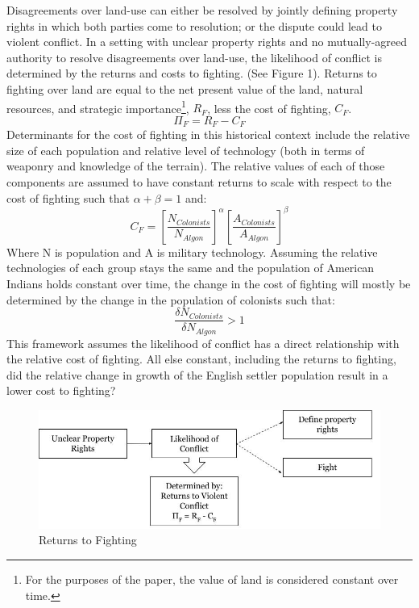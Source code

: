 \documentclass[11pt, oneside]{article}
\begin{document}
Disagreements over land-use can either be resolved by jointly defining property rights in which both parties come to resolution; or the dispute could lead to violent conflict. In a setting with unclear property rights and no mutually-agreed authority to resolve disagreements over land-use, the likelihood of conflict is determined by the returns and costs to fighting. (See Figure 1). Returns to fighting over land are equal to the net present value of the land, natural resources, and strategic importance\footnote{For the purposes of the paper, the value of land is considered constant over time.}, $ R_{F} $, less the cost of fighting, $ C_{F} $.
$$ \Pi_{F} = R_{F} - C_{F} $$
Determinants for the cost of fighting in this historical context include the relative size of each population and relative level of technology (both in terms of weaponry and knowledge of the terrain). The relative values of each of those components are assumed to have constant returns to scale with respect to the cost of fighting such that $\alpha + \beta = 1$ and:
$$C_{F} =  \left[ \frac{N_{Colonists}}{N_{Algon}} \right]^{\alpha}  \left[ \frac{A_{Colonists}}{A_{Algon}} \right]^{\beta}$$
Where N is population and A is military technology. Assuming the relative technologies of each group stays the same and the population of American Indians holds constant over time, the change in the cost of fighting will mostly be determined by the change in the population of colonists such that:
$$ \frac{\delta N_{Colonists}}{\delta N_{Algon}} > 1$$
This framework assumes the likelihood of conflict has a direct relationship with the relative cost of fighting. All else constant, including the returns to fighting, did the relative change in growth of the English settler population result in a lower cost to fighting? 
\\

\begin{figure}
\caption{Returns to Fighting}
  \includegraphics[scale=.65]{TheoryGraph.jpg} 
\end{figure}
\end{document}
